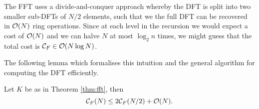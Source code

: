 The FFT uses a divide-and-conquer approach whereby the DFT is split into two smaller sub-DFTs of $N/2$ elements, such that we the full DFT can be recovered in $\mathcal O(N)$ ring operations. Since at each level in the recursion we would expect a cost of $\mathcal O(N)$ and we can halve $N$ at most $\log_2 n$ times, we might guess that the total cost is $\mathcal C_F \in \mathcal O(N \log N)$.

The following lemma which formalises this intuition and the general algorithm for computing the DFT efficiently. 

\begin{lemma}\label{lem:fft-recursion}
    Let $K$ be as in Theorem \ref{thm:fft}, then 
    \begin{equation}\label{eq:fftlem}
        \mathcal C_F(N) \le 2 \mathcal C_F(N/2) + \mathcal O(N).
    \end{equation}
\end{lemma}

